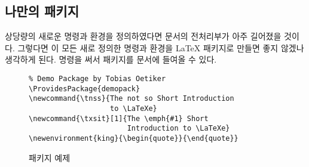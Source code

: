 \subsection{나만의 패키지}

상당량의 새로운 명령과 환경을 정의하였다면 문서의 전처리부가 아주 길어졌을 것이다.
그렇다면 이 모든 새로 정의한 명령과 환경을 \LaTeX{} 패키지로 만들면 좋지 않겠나 생각하게 된다.  명령을 써서 패키지를 문서에 들여올 수 있다.

\begin{figure}[!htbp]
\begin{lined}{\textwidth}
\begin{verbatim}
% Demo Package by Tobias Oetiker
\ProvidesPackage{demopack}
\newcommand{\tnss}{The not so Short Introduction
                   to \LaTeXe}
\newcommand{\txsit}[1]{The \emph{#1} Short
                       Introduction to \LaTeXe}
\newenvironment{king}{\begin{quote}}{\end{quote}}
\end{verbatim}
\end{lined}
\caption{패키지 예제} \label{package}
\end{figure}


